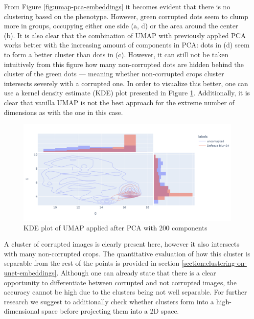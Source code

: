 From Figure \ref{fig:umap-pca-embeddings} it becomes evident that there is no clustering based on the phenotype. However, green corrupted dots seem to clump more in groups, occupying either one side (a, d) or the area around the center (b). It is also clear that the combination of UMAP with previously applied PCA works better with the increasing amount of components in PCA: dots in (d) seem to form a better cluster than dots in (c). However, it can still not be taken intuitively from this figure how many non-corrupted dots are hidden behind the cluster of the green dots --- meaning whether non-corrupted crops cluster intersects severely with a corrupted one. In order to visualize this better, one can use a kernel density estimate (KDE) plot presented in Figure \ref{fig:kde}. Additionally, it is clear that vanilla UMAP is not the best approach for the extreme number of dimensions as with the one in this case.

\begin{figure}[htb]
	\begin{center}
		\includegraphics[width=0.6\linewidth]{bilder/unet-embeddings/kde.png}
	\caption{KDE plot of UMAP applied after PCA with 200 components}\label{fig:kde}
	\end{center}
\end{figure}

A cluster of corrupted images is clearly present here, however it also intersects with many non-corrupted crops. The quantitative evaluation of how this cluster is separable from the rest of the points is provided in section \ref{section:clustering-on-unet-embeddings}. Although one can already state that there is a clear opportunity to differentiate between corrupted and not corrupted images, the accuracy cannot be high due to the clusters being not well separable. For further research we suggest to additionally check whether clusters form into a high-dimensional space before projecting them into a 2D space. 
